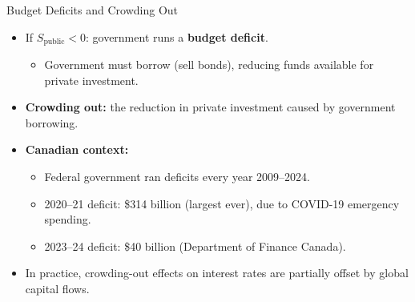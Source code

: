 \documentclass[aspectratio=169]{beamer}
\begin{document}
\begin{frame}{Budget Deficits and Crowding Out}
\transfade
\begin{itemize}[<+->]
  \item If $S_{\text{public}} < 0$: government runs a \textbf{budget deficit}.
  \begin{itemize}[<+->]
    \item Government must borrow (sell bonds), reducing funds available for private investment.
  \end{itemize}
  \item \textbf{Crowding out:} the reduction in private investment caused by government borrowing.
  \item \textbf{Canadian context:}
  \begin{itemize}[<+->]
    \item Federal government ran deficits every year 2009--2024.
    \item 2020--21 deficit: \alert{\$314 billion} (largest ever), due to COVID-19 emergency spending.
    \item 2023--24 deficit: \$40 billion (Department of Finance Canada).
  \end{itemize}
  \item In practice, crowding-out effects on interest rates are partially offset by global capital flows.
\end{itemize}
\end{frame}

\end{document}
